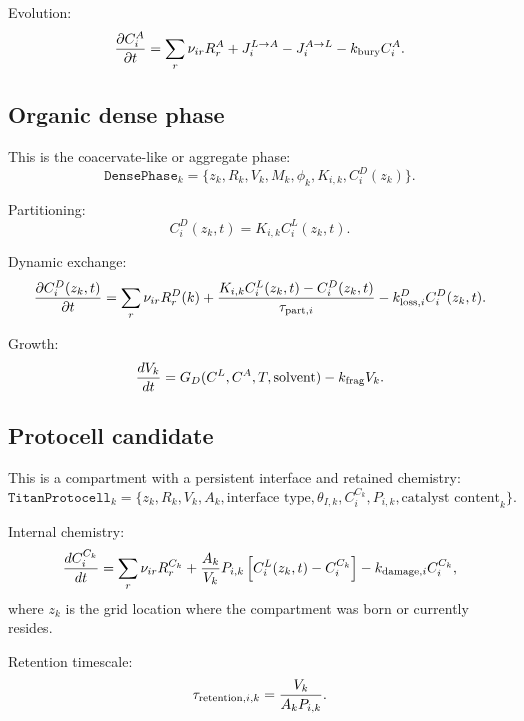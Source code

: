 \documentclass[11pt]{article}
\begin{document}
Evolution:
\begin{equation}
\frac{\partial C_i^A}{\partial t}
=
\sum_r \nu_{ir}R_r^A
+J_i^{L\rightarrow A}
-J_i^{A\rightarrow L}
-k_{\rm bury}C_i^A.
\end{equation}

\subsection{Organic dense phase}

This is the coacervate-like or aggregate phase:
\begin{equation}
\texttt{DensePhase}_k
=
\{z_k,R_k,V_k,M_k,\phi_k,K_{i,k},C_i^D(z_k)\}.
\end{equation}

Partitioning:
\begin{equation}
C_i^D(z_k,t)=K_{i,k}C_i^L(z_k,t).
\end{equation}

Dynamic exchange:
\begin{equation}
\frac{\partial C_i^D(z_k,t)}{\partial t}
=
\sum_r \nu_{ir}R_r^D(k)
+
\frac{K_{i,k}C_i^L(z_k,t)-C_i^D(z_k,t)}{\tau_{{\rm part},i}}
-k_{{\rm loss},i}^D C_i^D(z_k,t).
\end{equation}

Growth:
\begin{equation}
\frac{dV_k}{dt}
=
G_D(C^L,C^A,T,\text{solvent})
-k_{\rm frag}V_k.
\end{equation}

\subsection{Protocell candidate}

This is a compartment with a persistent interface and retained chemistry:
\begin{equation}
\texttt{TitanProtocell}_k
=
\{z_k,R_k,V_k,A_k,\text{interface type},\theta_{I,k},C_i^{C_k},P_{i,k},\text{catalyst content}_k\}.
\end{equation}

Internal chemistry:
\begin{equation}
\frac{dC_i^{C_k}}{dt}
=
\sum_r \nu_{ir}R_r^{C_k}
+\frac{A_k}{V_k}P_{i,k}\left[C_i^L(z_k,t)-C_i^{C_k}\right]
-k_{{\rm damage},i}C_i^{C_k},
\end{equation}
where $z_k$ is the grid location where the compartment was born or currently resides.

Retention timescale:
\begin{equation}
\tau_{{\rm retention},i,k}
=
\frac{V_k}{A_kP_{i,k}}.
\end{equation}
\end{document}
